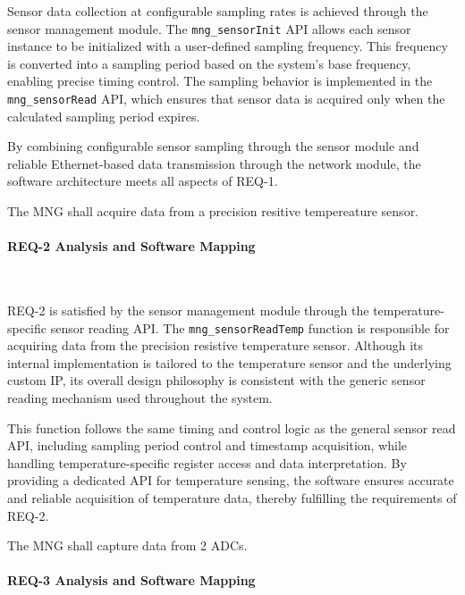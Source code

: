 \documentclass{article}
\begin{document}
Sensor data collection at configurable sampling rates is achieved through the sensor 
management module. The \texttt{mng\_sensorInit} API allows each sensor instance to be 
initialized with a user-defined sampling frequency. This frequency is converted into
a sampling period based on the system’s base frequency, enabling precise timing 
control. The sampling behavior is implemented in the \texttt{mng\_sensorRead} API, which 
ensures that sensor data is acquired only when the calculated sampling period 
expires.

By combining configurable sensor sampling through the sensor module and reliable 
Ethernet-based data transmission through the network module, the software 
architecture meets all aspects of REQ-1.


\begin{tcolorbox}[
    title=REQ-2,
    colback=gray!5,
    colframe=black,
    fonttitle=\bfseries
]
The MNG shall acquire data from a precision resitive tempereature sensor.
\end{tcolorbox}

\paragraph{REQ-2 Analysis and Software Mapping}\

REQ-2 is satisfied by the sensor management module through the temperature-specific 
sensor reading API. The \texttt{mng\_sensorReadTemp} function is responsible for acquiring 
data from the precision resistive temperature sensor. Although its internal 
implementation is tailored to the temperature sensor and the underlying custom IP, 
its overall design philosophy is consistent with the generic sensor reading mechanism 
used throughout the system.

This function follows the same timing and control logic as the general sensor read 
API, including sampling period control and timestamp acquisition, while handling 
temperature-specific register access and data interpretation. By providing a 
dedicated API for temperature sensing, the software ensures accurate and reliable 
acquisition of temperature data, thereby fulfilling the requirements of REQ-2.

\begin{tcolorbox}[
    title=REQ-3,
    colback=gray!5,
    colframe=black,
    fonttitle=\bfseries
]
The MNG shall capture data from 2 ADCs.
\end{tcolorbox}

\paragraph{REQ-3 Analysis and Software Mapping}\
\end{document}
